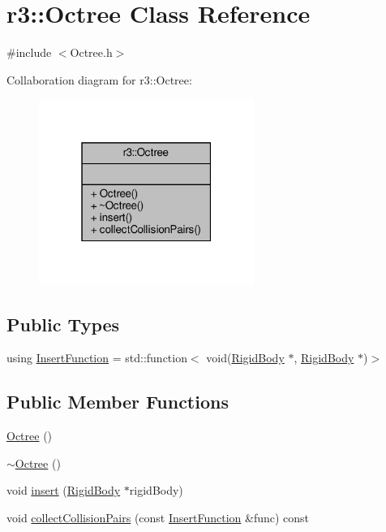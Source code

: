 \hypertarget{classr3_1_1_octree}{}\section{r3\+:\+:Octree Class Reference}
\label{classr3_1_1_octree}


{\ttfamily \#include $<$Octree.\+h$>$}



Collaboration diagram for r3\+:\+:Octree\+:\nopagebreak
\begin{figure}[H]
\begin{center}
\leavevmode
\includegraphics[width=199pt]{classr3_1_1_octree__coll__graph}
\end{center}
\end{figure}
\subsection*{Public Types}
\begin{DoxyCompactItemize}
\item 
using \mbox{\hyperlink{classr3_1_1_octree_a39df948aedb55b9aaea780e7c6790bbd}{Insert\+Function}} = std\+::function$<$ void(\mbox{\hyperlink{classr3_1_1_rigid_body}{Rigid\+Body}} $\ast$, \mbox{\hyperlink{classr3_1_1_rigid_body}{Rigid\+Body}} $\ast$)$>$
\end{DoxyCompactItemize}
\subsection*{Public Member Functions}
\begin{DoxyCompactItemize}
\item 
\mbox{\hyperlink{classr3_1_1_octree_a200bd5344aeb1a4104cc0ade928ed351}{Octree}} ()
\item 
\mbox{\hyperlink{classr3_1_1_octree_aa7940964258297d65ecad5e30223b774}{$\sim$\+Octree}} ()
\item 
void \mbox{\hyperlink{classr3_1_1_octree_a846b91cbb3ce3a66a61a857dca3c266c}{insert}} (\mbox{\hyperlink{classr3_1_1_rigid_body}{Rigid\+Body}} $\ast$rigid\+Body)
\item 
void \mbox{\hyperlink{classr3_1_1_octree_aca2c5fa53dc0c7f6b3f9b97e7e6c2375}{collect\+Collision\+Pairs}} (const \mbox{\hyperlink{classr3_1_1_octree_a39df948aedb55b9aaea780e7c6790bbd}{Insert\+Function}} \&func) const
\end{DoxyCompactItemize}



